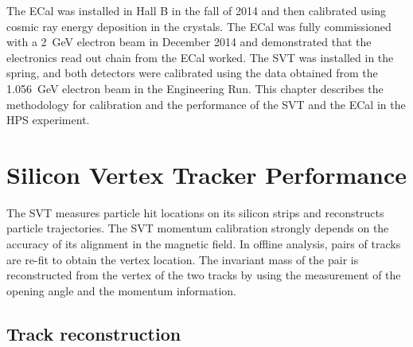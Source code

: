 The ECal was installed in Hall B in the fall of 2014 and then calibrated using cosmic ray energy deposition in the crystals. The ECal was fully commissioned with a 2~GeV electron beam in December 2014 and demonstrated that the electronics read out chain from the ECal worked. The SVT was installed in the spring, and both detectors were calibrated using the data obtained from the 1.056~GeV electron beam in the Engineering Run. This chapter describes the methodology for calibration and the performance of the SVT and the ECal in the HPS experiment. 

\section{Silicon Vertex Tracker Performance}
The SVT measures particle hit locations on its silicon strips and reconstructs particle trajectories. The SVT momentum calibration strongly depends on the accuracy of its alignment in the magnetic field. In offline analysis, pairs of tracks are re-fit to obtain the vertex location. The invariant mass of the pair is reconstructed from the vertex of the two tracks by using the measurement of the opening angle and the momentum information. 

\subsection{Track reconstruction}

